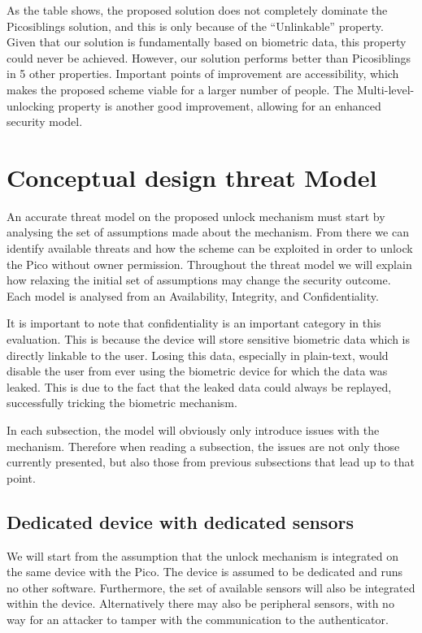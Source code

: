 As the table shows, the proposed solution does not completely dominate the Picosiblings solution, and this is only because of the ``Unlinkable'' property. Given that our solution is fundamentally based on biometric data, this property could never be achieved. However, our solution performs better than Picosiblings in 5 other properties. Important points of improvement are accessibility, which makes the proposed scheme viable for a larger number of people. The Multi-level-unlocking property is another good improvement, allowing for an enhanced security model.



\section{Conceptual design threat Model}



An accurate threat model on the proposed unlock mechanism must start by analysing the set of assumptions made about the mechanism. From there we can identify available threats and how the scheme can be exploited in order to unlock the Pico without owner permission. Throughout the threat model we will explain how relaxing the initial set of assumptions may change the security outcome. Each model is analysed from an Availability, Integrity, and Confidentiality.

It is important to note that confidentiality is an important category in this evaluation. This is because the device will store sensitive biometric data which is directly linkable to the user. Losing this data, especially in plain-text, would disable the user from ever using the biometric device for which the data was leaked. This is due to the fact that the leaked data could always be replayed, successfully tricking the biometric mechanism.

In each subsection, the model will obviously only introduce issues with the mechanism. Therefore when reading a subsection, the issues are not only those currently presented, but also those from previous subsections that lead up to that point.

\subsection{Dedicated device with dedicated sensors}
We will start from the assumption that the unlock mechanism is integrated on the same device with the Pico. The device is assumed to be dedicated and runs no other software. Furthermore, the set of available sensors will also be integrated within the device. Alternatively there may also be peripheral sensors, with no way for an attacker to tamper with the communication to the authenticator. 

